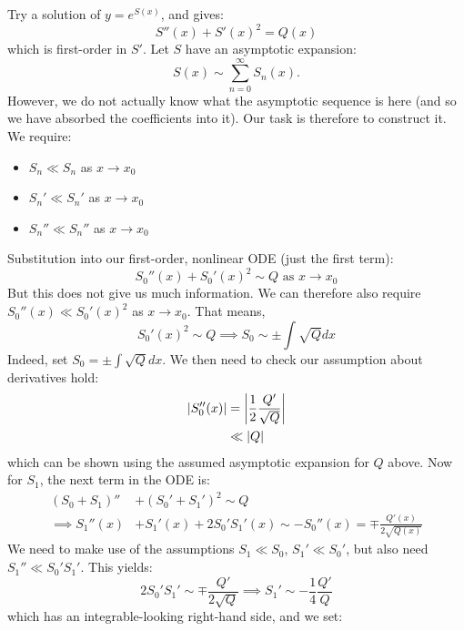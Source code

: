 \documentclass[../Main.tex]{subfiles}
\begin{document}
Try a solution of $y = e^{S(x)}$, and  gives:
\begin{equation*}
    S''(x) + S'(x)^2 = Q(x)
\end{equation*}
which is first-order in $S'$. Let $S$ have an asymptotic expansion:
\begin{equation*}
    S(x) \sim \sum_{n = 0}^{\infty} S_n(x).
\end{equation*}
However, we do not actually know what the asymptotic sequence is here (and so we have absorbed the coefficients into it). Our task is therefore to construct it. We require:
\begin{itemize}
    \item $S_{n} \ll S_n$ as $x \to x_0$
    \item $S_{n}' \ll S_n'$ as $x \to x_0$
    \item $S_{n}'' \ll S_n''$ as $x \to x_0$
\end{itemize}
Substitution into our first-order, nonlinear ODE (just the first term):
\begin{equation*}
    S_0''(x) + S_0'(x)^2 \sim Q \text{ as } x \to x_0
\end{equation*}
But this does not give us much information. We can therefore also require $S_0''(x) \ll S_0'(x)^2$ as $x \to x_0$. That means,
\begin{equation*}
    S_0'(x)^2 \sim Q \implies S_0 \sim \pm \int \sqrt{Q} dx
\end{equation*}
Indeed, set $S_0 = \pm \int \sqrt{Q} dx$. We then need to check our assumption about derivatives hold:
\begin{align*}
    \left|S_0''(x)\right| &= \left|\frac12 \frac{Q'}{\sqrt{Q}}\right| \\
    &\ll \left|Q\right|
\end{align*}
which can be shown using the assumed asymptotic expansion for $Q$ above. Now for $S_1$, the next term in the ODE is:
\begin{align*}
    (S_0 + S_1)'' &+ (S_0' + S_1')^2 \sim Q \\
    \implies S_1''(x) &+ S_1'(x) + 2S_0' S_1'(x) \sim -S_0''(x) = \mp \frac{Q'(x)}{2\sqrt{Q(x)}}
\end{align*}
We need to make use of the assumptions $S_1 \ll S_0$, $S_1'\ll S_0'$, but also need $S_1'' \ll S_0' S_1'$. This yields:
\begin{equation*}
    2S_0' S_1' \sim \mp \frac{Q'}{2\sqrt{Q}} \implies S_1' \sim -\frac14 \frac{Q'}{Q}
\end{equation*}
which has an integrable-looking right-hand side, and we set:
\end{document}
